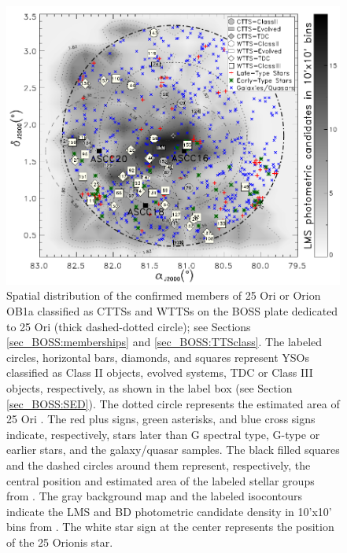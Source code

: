 \documentclass[12pt]{article}
\begin{document}
\begin{figure}[ht!]
	\centering
	\includegraphics[width=1.\textwidth]{f1.pdf}
	\caption[Spatial distribution of the targets in the 25 Ori BOSS plate]{Spatial distribution of the confirmed members of 25 Ori or Orion OB1a classified as CTTSs and WTTSs on the BOSS plate dedicated to 25 Ori (thick dashed-dotted circle); see Sections \ref{sec_BOSS:memberships} and \ref{sec_BOSS:TTSclass}. The labeled circles, horizontal bars, diamonds, and squares represent YSOs classified as Class II objects, evolved systems, TDC or Class III objects, respectively, as shown in the label box (see Section \ref{sec_BOSS:SED}). The dotted circle represents the estimated area of 25 Ori \citep[1$^\circ$ radius; ][]{Briceno2005,Briceno2007}. The red plus signs, green asterisks, and blue cross signs indicate, respectively, stars later than G spectral type, G-type or earlier stars, and the galaxy/quasar samples. The black filled squares and the dashed circles around them represent, respectively, the central position and estimated area of the labeled stellar groups from \citet{Kharchenko2013}. The gray background map and the labeled isocontours indicate the LMS and BD photometric candidate density in 10'x10' bins from \cite{Downes2014}. The white star sign at the center represents the position of the 25 Orionis star.}
	\label{fig_BOSS:sky}
\end{figure}
\end{document}
